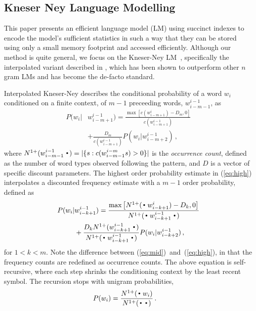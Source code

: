 
\subsection{Kneser Ney Language Modelling}
\label{sec-lm}


This paper presents an efficient \ngram language model (LM) using succinct indexes to encode the model's sufficient statistics in such a way that they can be stored using only a small memory footprint and accessed efficiently. 
Although our method is quite general, we focus on the Kneser-Ney LM~\cite{kneser1995improved}, specifically the interpolated variant described in , which has been shown to outperform other $n$gram LMs and has become the de-facto standard.

Interpolated Kneser-Ney describes the conditional probability of a word $w_i$ conditioned on a finite context, of $m-1$ preceeding words, $w_{i-m-1}^{i-1}$, as 
\begin{align}
P(w_i |& w_{i-m+1}^{i-1})
 = \frac{\max\left[c(w^{i}_{i-m+1}) - D_m,0\right]}{c(w^{i-1}_{i-m+1})} \nonumber \\
& +\frac{D_m }{c(w^{i-1}_{i-m+1})}  P(w_i | w_{i-m+2}^{i-1}) \, , \label{eq:high}
\end{align}
where \mbox{$\nlplus{w^{i-1}_{i-m-1}\Bigcdot} = |\{s: c(w^{i-m}_{i-m-1}s)>0\}|$} is the \emph{occurrence count}, defined as the number of word types observed following the pattern, and $D$ is a vector of \ngram specific discount parameters.
The highest order probability estimate in (\ref{eq:high}) interpolates a discounted frequency estimate with a $m-1$ order probability, defined as 
\begin{align}
P(w_i |& w_{i-k+1}^{i-1})
 = \frac{\max\left[\nlplus{\Bigcdot w_{i-k+1}^{i}} - D_k,0\right]}{\nlplus{\Bigcdot w_{i-k+1}^{i-1} \Bigcdot}} \nonumber \\
&+ \frac{D_k \nlplus{w_{i-k+1}^{i-1}\Bigcdot}}{\nlplus{\Bigcdot w_{i-k+1}^{i-1} \Bigcdot}} P(w_i | w_{i-k+2}^{i-1}) \, ,\label{eq:mid}
\end{align}
for $1<k<m$. 
Note the difference between (\ref{eq:mid})~and~(\ref{eq:high}), in that the frequency counts are redefined as occurrence counts. 
The above equation is self-recursive, where each step shrinks the conditioning context by the least recent symbol. 
The recursion stops with unigram probabilities,
\begin{align}
\label{eq:low}
P(w_i) &= \frac{\nlplus{\Bigcdot w_i}}{\nlplus{\Bigcdot\Bigcdot}} \, .
\end{align}

